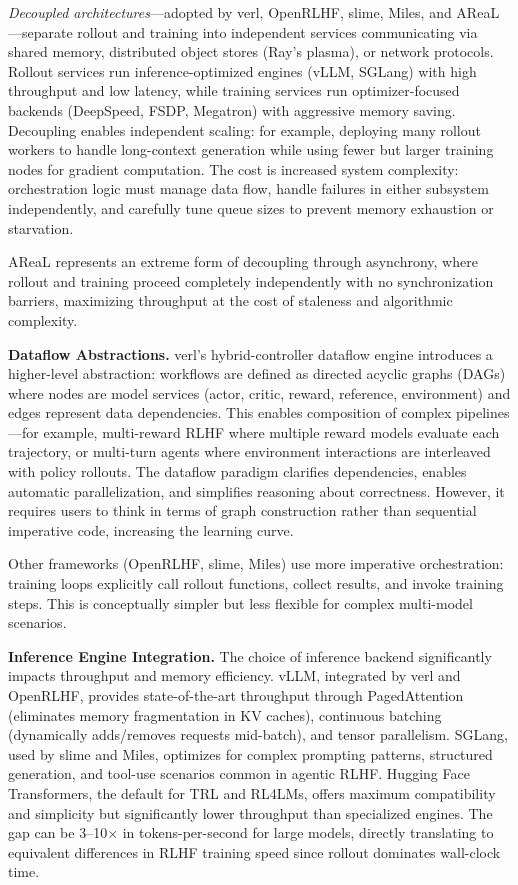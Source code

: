 \documentclass[conference]{IEEEtran}
\begin{document}
\textit{Decoupled architectures}—adopted by verl, OpenRLHF, slime, Miles, and AReaL—separate rollout and training into independent services communicating via shared memory, distributed object stores (Ray's plasma), or network protocols. Rollout services run inference-optimized engines (vLLM, SGLang) with high throughput and low latency, while training services run optimizer-focused backends (DeepSpeed, FSDP, Megatron) with aggressive memory saving. Decoupling enables independent scaling: for example, deploying many rollout workers to handle long-context generation while using fewer but larger training nodes for gradient computation. The cost is increased system complexity: orchestration logic must manage data flow, handle failures in either subsystem independently, and carefully tune queue sizes to prevent memory exhaustion or starvation.

AReaL represents an extreme form of decoupling through asynchrony, where rollout and training proceed completely independently with no synchronization barriers, maximizing throughput at the cost of staleness and algorithmic complexity.

\textbf{Dataflow Abstractions.} verl's hybrid-controller dataflow engine introduces a higher-level abstraction: workflows are defined as directed acyclic graphs (DAGs) where nodes are model services (actor, critic, reward, reference, environment) and edges represent data dependencies. This enables composition of complex pipelines—for example, multi-reward RLHF where multiple reward models evaluate each trajectory, or multi-turn agents where environment interactions are interleaved with policy rollouts. The dataflow paradigm clarifies dependencies, enables automatic parallelization, and simplifies reasoning about correctness. However, it requires users to think in terms of graph construction rather than sequential imperative code, increasing the learning curve.

Other frameworks (OpenRLHF, slime, Miles) use more imperative orchestration: training loops explicitly call rollout functions, collect results, and invoke training steps. This is conceptually simpler but less flexible for complex multi-model scenarios.

\textbf{Inference Engine Integration.} The choice of inference backend significantly impacts throughput and memory efficiency. vLLM, integrated by verl and OpenRLHF, provides state-of-the-art throughput through PagedAttention (eliminates memory fragmentation in KV caches), continuous batching (dynamically adds/removes requests mid-batch), and tensor parallelism. SGLang, used by slime and Miles, optimizes for complex prompting patterns, structured generation, and tool-use scenarios common in agentic RLHF. Hugging Face Transformers, the default for TRL and RL4LMs, offers maximum compatibility and simplicity but significantly lower throughput than specialized engines. The gap can be 3–10× in tokens-per-second for large models, directly translating to equivalent differences in RLHF training speed since rollout dominates wall-clock time.
\end{document}
